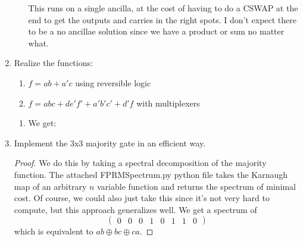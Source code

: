 \documentclass{article}
\begin{document}
\begin{enumerate}
\begin{enumerate}
            This runs on a single ancilla, at the cost of having to do a CSWAP at the end to get the outputs and carries in the right spots. I don't expect there to be a no ancillae solution since we have a product or sum no matter what.
        \end{enumerate}
    \item Realize the functions:
        \begin{enumerate}
            \item $f = ab + a'c$ using reversible logic
            \item $f = abc + de'f' + a'b'c' + d'f$ with multiplexers
        \end{enumerate}
        \begin{enumerate}
            \item We get:
        \end{enumerate}
    \item Implement the 3x3 majority gate in an efficient way.
    \begin{proof}
        We do this by taking a spectral decomposition of the majority function. The attached FPRMSpectrum.py python file takes the Karnaugh map of an arbitrary $n$ variable function and returns the spectrum of minimal cost. Of course, we could also just take this since it's not very hard to compute, but this approach generalizes well. We get a spectrum of \[\begin{pmatrix}
            0 & 0 & 0 &1 & 0 &1 & 1 & 0
        \end{pmatrix}\]
        which is equivalent to $ab\oplus bc \oplus ca.$
    \end{proof}
\end{enumerate}
\end{document}
